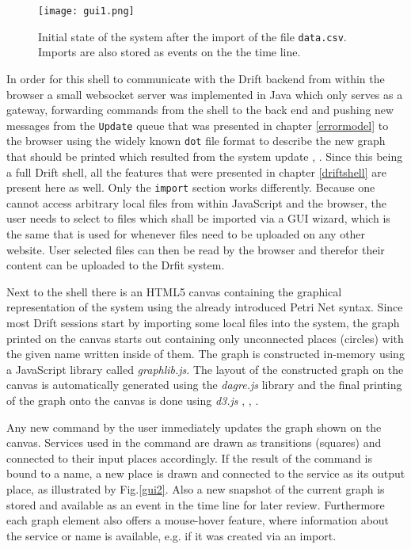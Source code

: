 \begin{figure}[h]
  \texttt{[image: gui1.png]}
  \caption{Initial state of the system after the import of
           the file \texttt{data.csv}. Imports are also stored
           as events on the the time line.}
  \label{gui1}
\end{figure}

In order for this shell to communicate with the Drift backend
from within the browser a small websocket server was implemented
in Java which only serves as a gateway, forwarding commands from
the shell to the back end and pushing new messages from the
\texttt{Update} queue that was presented in
chapter \ref{errormodel} to the browser using the widely known
\texttt{dot} file format to describe the new graph that should
be printed which resulted from the system update \cite{dotlang},
\cite{dotwiki}.
Since this being a full Drift shell, all the features that were
presented in chapter \ref{driftshell} are present here as well.
Only the \texttt{import} section works differently. Because
one cannot access arbitrary local files from within JavaScript
and the browser, the user needs to select to files which shall
be imported via a GUI wizard, which is the same that is used
for whenever files need to be uploaded on any other website.
User selected files can then be read by the browser and therefor
their content can be uploaded to the Drfit system.

Next to the shell there is an HTML5 canvas containing the graphical
representation of the system using the already introduced Petri Net syntax.
Since most Drift sessions start by importing some local files into the
system, the graph printed on the canvas starts out containing
only unconnected places (circles) with the given name written inside
of them.
The graph is constructed in-memory using a JavaScript library called
\textit{graphlib.js}. The layout of the constructed graph on the
canvas is automatically generated using the \textit{dagre.js}
library and the final printing of the graph onto the canvas is
done using \textit{d3.js} \cite{graphlibjs}, \cite{dagrejs},
\cite{d3js}.

Any new command by the user immediately updates the graph shown
on the canvas. Services used in the command are drawn as transitions
(squares) and connected to their input places accordingly.
If the result of the command is bound to a name, a new place is
drawn and connected to the service as its output place, as
illustrated by Fig.\ref{gui2}. Also a new snapshot of the
current graph is stored and available as an event in the time
line for later review. Furthermore each graph element also
offers a mouse-hover feature, where information about the
service or name is available, e.g. if it was created via an
import.

